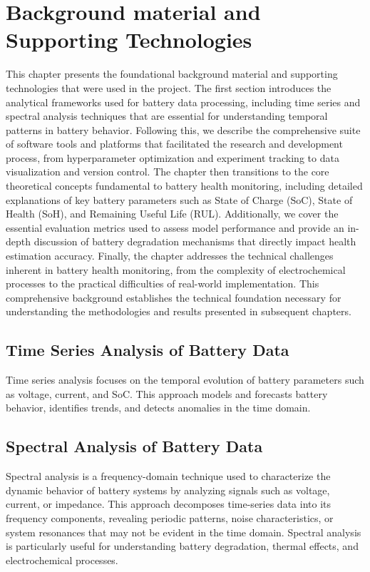 \chapter{Background material and Supporting Technologies}
\label{ch:background}

This chapter presents the foundational background material and supporting technologies that were used in the project. The first section introduces the analytical frameworks used for battery data processing, including time series and spectral analysis techniques that are essential for understanding temporal patterns in battery behavior. Following this, we describe the comprehensive suite of software tools and platforms that facilitated the research and development process, from hyperparameter optimization and experiment tracking to data visualization and version control. The chapter then transitions to the core theoretical concepts fundamental to battery health monitoring, including detailed explanations of key battery parameters such as State of Charge (SoC), State of Health (SoH), and Remaining Useful Life (RUL). Additionally, we cover the essential evaluation metrics used to assess model performance and provide an in-depth discussion of battery degradation mechanisms that directly impact health estimation accuracy. Finally, the chapter addresses the technical challenges inherent in battery health monitoring, from the complexity of electrochemical processes to the practical difficulties of real-world implementation. This comprehensive background establishes the technical foundation necessary for understanding the methodologies and results presented in subsequent chapters.

\section{Time Series Analysis of Battery Data}
Time series analysis focuses on the temporal evolution of battery parameters such as voltage, current, and SoC. This approach models and forecasts battery behavior, identifies trends, and detects anomalies in the time domain.

\section{Spectral Analysis of Battery Data}
Spectral analysis is a frequency-domain technique used to characterize the dynamic behavior of battery systems by analyzing signals such as voltage, current, or impedance. This approach decomposes time-series data into its frequency components, revealing periodic patterns, noise characteristics, or system resonances that may not be evident in the time domain. Spectral analysis is particularly useful for understanding battery degradation, thermal effects, and electrochemical processes.


